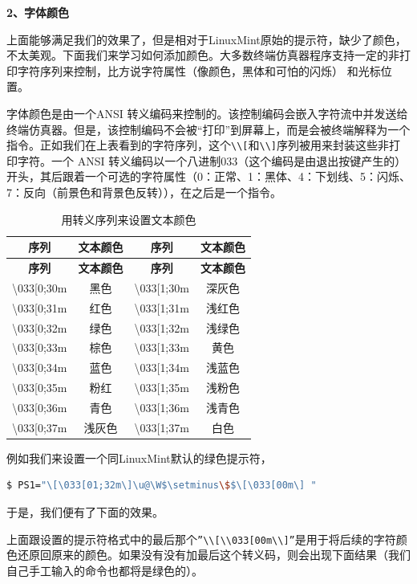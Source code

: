 \documentclass[doctor,openright,twoside]{sjtuthesis}
\newcommand{\passthrough}[1]{#1}
\theoremstyle{plain}
\theoremstyle{definition}
\theoremstyle{remark}
\theoremstyle{ocrenumbox}
\theoremstyle{plain}
\begin{document}
\textbf{2、字体颜色}

上面能够满足我们的效果了，但是相对于LinuxMint原始的提示符，缺少了颜色，不太美观。下面我们来学习如何添加颜色。大多数终端仿真器程序支持一定的非打印字符序列来控制，比方说字符属性（像颜色，黑体和可怕的闪烁）
和光标位置。

字体颜色是由一个ANSI
转义编码来控制的。该控制编码会嵌入字符流中并发送给终端仿真器。但是，该控制编码不会被``打印''到屏幕上，而是会被终端解释为一个指令。正如我们在上表看到的字符序列，这个\passthrough{\lstinline!\\[!}和\passthrough{\lstinline!\\]!}序列被用来封装这些非打印字符。一个
ANSI
转义编码以一个八进制033（这个编码是由退出按键产生的）开头，其后跟着一个可选的字符属性（0：正常、1：黑体、4：下划线、5：闪烁、7：反向（前景色和背景色反转）），在之后是一个指令。

\begin{longtable}[]{@{}cccc@{}}
\caption{用转义序列来设置文本颜色}\tabularnewline
\toprule
\textbf{序列} & \textbf{文本颜色} & \textbf{序列} &
\textbf{文本颜色}\tabularnewline
\midrule
\endfirsthead
\toprule
\textbf{序列} & \textbf{文本颜色} & \textbf{序列} &
\textbf{文本颜色}\tabularnewline
\midrule
\endhead
\textbackslash{}033{[}0;30m & 黑色 & \textbackslash{}033{[}1;30m &
深灰色\tabularnewline
\textbackslash{}033{[}0;31m & 红色 & \textbackslash{}033{[}1;31m &
浅红色\tabularnewline
\textbackslash{}033{[}0;32m & 绿色 & \textbackslash{}033{[}1;32m &
浅绿色\tabularnewline
\textbackslash{}033{[}0;33m & 棕色 & \textbackslash{}033{[}1;33m &
黄色\tabularnewline
\textbackslash{}033{[}0;34m & 蓝色 & \textbackslash{}033{[}1;34m &
浅蓝色\tabularnewline
\textbackslash{}033{[}0;35m & 粉红 & \textbackslash{}033{[}1;35m &
浅粉色\tabularnewline
\textbackslash{}033{[}0;36m & 青色 & \textbackslash{}033{[}1;36m &
浅青色\tabularnewline
\textbackslash{}033{[}0;37m & 浅灰色 & \textbackslash{}033{[}1;37m &
白色\tabularnewline
\bottomrule
\end{longtable}

例如我们来设置一个同LinuxMint默认的绿色提示符，

\begin{lstlisting}[language=bash]
$ PS1="\[\033[01;32m\]\u@\W$\setminus\$$\[\033[00m\] "
\end{lstlisting}

于是，我们便有了下面的效果。

上面跟设置的提示符格式中的最后那个\passthrough{\lstinline!”\\[\\033[00m\\]”!}是用于将后续的字符颜色还原回原来的颜色。如果没有没有加最后这个转义码，则会出现下面结果（我们自己手工输入的命令也都将是绿色的）。
\end{document}
